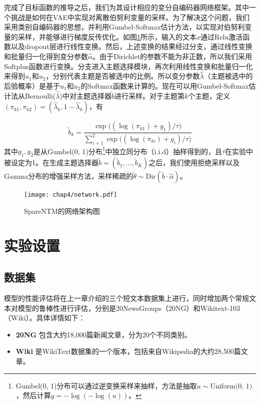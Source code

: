 完成了目标函数的推导之后，我们为其设计相应的变分自编码器网络框架。其中一个挑战是如何在VAE中实现对离散伯努利变量的采样。为了解决这个问题，我们采用类别自编码器的思想，并利用Gumbel-Softmax估计方法，以实现对伯努利变量的采样，并能够进行梯度反传优化。如图\ref{framework}所示，输入的文本$x$通过Relu激活函数以及dropout层进行线性变换。然后，上述变换的结果经过分支，通过线性变换和批量归一化得到变分参数$\hat{\alpha}$。由于Dirichlet的参数不能为非正数，所以我们采用Softplus函数进行变换。分支进入主题选择模块，再次利用线性变换和批量归一化来得到$u_1$和$u_2$，分别代表主题是否被选中的比例。所以变分参数$\hat{\lambda}$（主题被选中的后验概率）是基于$u_1$和$u_2$的Softmax函数来计算的。现在可以用Gumbel-Softmax估计法从Bernoulli($\hat{\lambda}$)中对主题选择器$\tilde{b}$进行采样。对于主题第$k$个主题，定义$(\pi_{k1},\pi_{k2})=(\hat{\lambda}_k,1-\hat{\lambda}_k)$，有

\begin{equation}
	\tilde{b}_k=\frac{\exp{((\log(\pi_{k1})+g_1)/\tau})}{\sum_{i=1}^2\exp{((\log(\pi_{ki})+g_i)/\tau})}
\end{equation}
其中$g_1,g_2$是从Gumbel(0, 1)分布\footnote{Gumbel(0, 1)分布可以通过逆变换采样来抽样，方法是抽取$u\sim\mbox{Uniform(0, 1)}$，然后计算$g=-\log(-\log(u))$。}中独立同分布（i.i.d）抽样得到的，且$\tau$在实验中被设定为1。在生成主题选择器$\tilde{b}=(\tilde{b}_1,\dots,\tilde{b}_K)$之后，我们使用拒绝采样以及Gamma分布的增强采样方法\cite{DVAE,RSVI}，采样稀疏的$\tilde{\theta}\sim\mbox{Dir}(\tilde{b}\cdot\hat{\alpha})$。

\begin{figure}[ht]
    \centering
    \texttt{[image: chap4/network.pdf]}
    \caption{SpareNTM的网络架构图} \label{framework}
\end{figure}


\section{实验设置}
\subsection{数据集}
模型的性能评估将在上一章介绍的三个短文本数据集上进行，同时增加两个常规文本对模型的鲁棒性进行评估，分别是20NewsGroups（20NG）和Wikitext-103（Wiki）\cite{wiki}。具体详情如下：
\begin{itemize}
\item \textbf{20NG} 包含大约18,000篇新闻文章，分为20个不同类别。
\item \textbf{Wiki} 是WikiText数据集的一个版本，包括来自Wikipedia的大约28,500篇文章。
\end{itemize}

